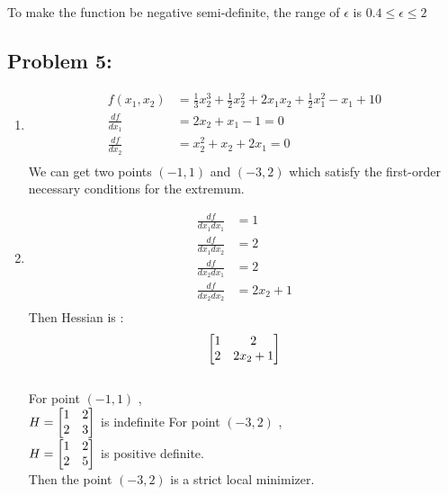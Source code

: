 \documentclass{article}
\begin{document}
To make the function be negative semi-definite, the range of $\epsilon$ is $ 0.4 \leq \epsilon \leq 2 $ 

\subsection*{Problem 5: } 
\begin{enumerate} 
\item
\begin{align*}
f(x_1, x_2) & = \frac{1}{3}x_2^3 + \frac{1}{2}x_2^2 + 2x_1x_2 + \frac{1}{2}x_1^2-x_1+10 \\
\frac{df}{dx_1} &= 2x_2 + x_1 -1 = 0 \\
\frac{df}{dx_2} &= x_2^2 +x_2 + 2x_1 = 0 \\
\end{align*} 
We can get two points $(-1, 1)$ and $(-3, 2)$ which satisfy the first-order necessary conditions for the extremum. \\
\item 
\begin{align*} 
\frac{df}{dx_1dx_1} &= 1 \\
\frac{df}{dx_1dx_2} &=  2 \\
\frac{df}{dx_2dx_1} &= 2 \\
\frac{df}{dx_2dx_2} &= 2x_2 + 1 \\
\end{align*}
Then Hessian is : \begin{align*} \begin{bmatrix} 1 & 2 \\ 2 & 2x_2 + 1 \end{bmatrix} \end{align*} \\
For point $(-1, 1)$ , \\
$H = \begin{bmatrix} 1 & 2 \\ 2 & 3 \end{bmatrix} $  is indefinite
For point $(-3, 2) $ , \\
$H = \begin{bmatrix} 1 & 2 \\ 2 & 5 \end{bmatrix} $ is positive definite. \\
Then the point $(-3, 2)$ is a strict local minimizer. 

\end{enumerate} 
\end{document}
